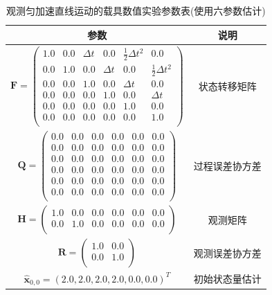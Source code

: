 \documentclass[12pt]{article}
\begin{document}
\begin{table}[htbp]
\centering
\caption{观测匀加速直线运动的载具数值实验参数表(使用六参数估计)}
\label{tab:experimaent_3_parameters_state6}
\begin{tabular}{cc} 
\hline 			
参数 & 说明  \\  
\hline 
$\bm{F} =    
   \begin{pmatrix} %
      1.0 & 0.0 & \Delta t & 0.0 & \frac{1}{2} \Delta t^2 & 0.0 \\
      0.0 & 1.0 & 0.0 & \Delta t & 0.0 & \frac{1}{2} \Delta t^2 \\
      0.0 & 0.0 & 1.0 & 0.0 & \Delta t & 0.0 \\
      0.0 & 0.0 & 0.0 & 1.0 & 0.0 & \Delta t \\
      0.0 & 0.0 & 0.0 & 0.0 & 1.0 & 0.0 \\
      0.0 & 0.0 & 0.0 & 0.0 & 0.0 & 1.0 \\
   \end{pmatrix}$ & 状态转移矩阵 \\ 
$\bm{Q} =    
   \begin{pmatrix} %
      0.0 & 0.0 & 0.0 & 0.0 & 0.0 & 0.0 \\
      0.0 & 0.0 & 0.0 & 0.0 & 0.0 & 0.0 \\
      0.0 & 0.0 & 0.0 & 0.0 & 0.0 & 0.0 \\
      0.0 & 0.0 & 0.0 & 0.0 & 0.0 & 0.0 \\
      0.0 & 0.0 & 0.0 & 0.0 & 0.0 & 0.0 \\
      0.0 & 0.0 & 0.0 & 0.0 & 0.0 & 0.0 \\
   \end{pmatrix}$ & 过程误差协方差 \\
$\bm{H} = 
   \begin{pmatrix} %
      1.0 & 0.0 & 0.0 & 0.0 & 0.0 & 0.0 \\
      0.0 & 1.0 & 0.0 & 0.0 & 0.0 & 0.0 \\
   \end{pmatrix}$ & 观测矩阵 \\
$\bm{R} = 
   \begin{pmatrix} %
      1.0 & 0.0 \\
      0.0 & 1.0 \\
   \end{pmatrix}$ & 观测误差协方差 \\
$\hat{\bm{x}}_{0,0} = (2.0, 2.0, 2.0, 2.0, 0.0, 0.0)^T$ & 初始状态量估计 \\

\end{tabular}
\end{table}
\end{document}

